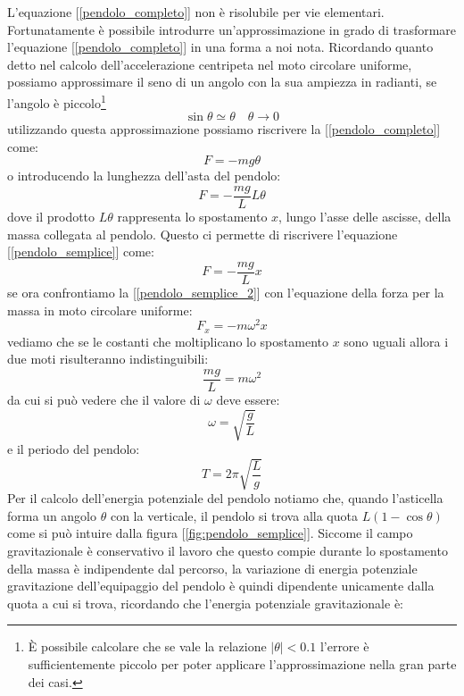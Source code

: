 \documentclass[a4paper,10pt,oneside]{article}
\begin{document}
L'equazione [\ref{pendolo_completo}] non è risolubile per vie elementari. Fortunatamente è possibile introdurre un'approssimazione in grado di trasformare l'equazione [\ref{pendolo_completo}] in una forma a noi nota. Ricordando quanto detto nel calcolo dell'accelerazione centripeta nel moto circolare uniforme, possiamo approssimare il seno di un angolo con la sua ampiezza in radianti, se l'angolo è piccolo\footnote{È possibile calcolare che se vale la relazione $|\theta|<0.1$ l'errore è sufficientemente piccolo per poter applicare l'approssimazione nella gran parte dei casi.}
\begin{equation}
 \sin\theta\simeq \theta\quad \theta\to 0
\end{equation}
utilizzando questa approssimazione possiamo riscrivere la [\ref{pendolo_completo}] come:
\begin{equation}
 F=-mg\theta
\end{equation}
o introducendo la lunghezza dell'asta del pendolo:
\begin{equation}\label{pendolo_semplice}
 F=-\frac{mg}{L}L\theta
\end{equation}
dove il prodotto $L\theta$ rappresenta lo spostamento $x$, lungo l'asse delle ascisse, della massa collegata al pendolo. Questo  ci permette di riscrivere l'equazione [\ref{pendolo_semplice}] come:
\begin{equation}\label{pendolo_semplice_2}
 F=-\frac{mg}{L}x
\end{equation}
 se ora confrontiamo la [\ref{pendolo_semplice_2}] con l'equazione della forza per la massa in moto circolare uniforme:
\begin{equation}
 F_x=-m\omega^2x
\end{equation}
 vediamo che se le costanti che moltiplicano lo spostamento $x$ sono uguali allora i due moti risulteranno indistinguibili:
\begin{equation}
 \frac{mg}{L}=m\omega^2
\end{equation}
da cui si può vedere che il valore di $\omega$ deve essere:
\begin{equation}
 \omega=\sqrt{\frac g L}
\end{equation}
e il periodo del pendolo:
\begin{equation}
 T=2\pi\sqrt{\frac L g}
\end{equation}
Per il calcolo dell'energia potenziale del pendolo notiamo che, quando l'asticella forma un angolo $\theta$ con la verticale, il pendolo si trova alla quota $L(1-\cos\theta)$ come si può intuire dalla figura [\ref{fig:pendolo_semplice}]. Siccome il campo gravitazionale è conservativo il lavoro che questo compie durante lo spostamento della massa è indipendente dal percorso, la variazione di energia potenziale gravitazione dell'equipaggio del pendolo è quindi dipendente unicamente dalla quota  a cui si trova, ricordando che l'energia potenziale gravitazionale è:
\end{document}
